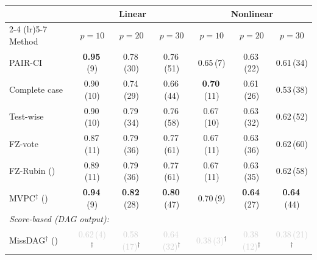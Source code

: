 \begin{tabular}{lcccccc}
    \toprule
                  & \multicolumn{3}{c}{Linear} & \multicolumn{3}{c}{Nonlinear} \\
    \cmidrule(lr){2-4} \cmidrule(lr){5-7}
    Method        & $p{=}10$ & $p{=}20$ & $p{=}30$ & $p{=}10$ & $p{=}20$ & $p{=}30$ \\
    \midrule
    PAIR-CI                                       & \textbf{0.95}\,{\scriptsize(9)} & 0.78\,{\scriptsize(30)} & 0.76\,{\scriptsize(51)} & 0.65\,{\scriptsize(7)} & 0.63\,{\scriptsize(22)} & 0.61\,{\scriptsize(34)} \\
    Complete case                                 & 0.90\,{\scriptsize(10)} & 0.74\,{\scriptsize(29)} & 0.66\,{\scriptsize(44)} & \textbf{0.70}\,{\scriptsize(11)} & 0.61\,{\scriptsize(26)} & 0.53\,{\scriptsize(38)} \\
    Test-wise                                     & 0.90\,{\scriptsize(10)} & 0.79\,{\scriptsize(34)} & 0.76\,{\scriptsize(58)} & 0.67\,{\scriptsize(10)} & 0.63\,{\scriptsize(32)} & 0.62\,{\scriptsize(52)} \\
    FZ-vote                                       & 0.87\,{\scriptsize(11)} & 0.79\,{\scriptsize(36)} & 0.77\,{\scriptsize(61)} & 0.67\,{\scriptsize(11)} & 0.63\,{\scriptsize(36)} & 0.62\,{\scriptsize(60)} \\
    FZ-Rubin (\citeauthor{witte2022multiple})     & 0.89\,{\scriptsize(11)} & 0.79\,{\scriptsize(36)} & 0.77\,{\scriptsize(61)} & 0.67\,{\scriptsize(11)} & 0.63\,{\scriptsize(35)} & 0.62\,{\scriptsize(58)} \\
    MVPC$^\ddagger$ (\citeauthor{tu2019causal})   & \textbf{0.94}\,{\scriptsize(9)} & \textbf{0.82}\,{\scriptsize(28)} & \textbf{0.80}\,{\scriptsize(47)} & 0.70\,{\scriptsize(9)} & \textbf{0.64}\,{\scriptsize(27)} & \textbf{0.64}\,{\scriptsize(44)} \\
    \midrule
    \multicolumn{7}{l}{\emph{Score-based (DAG output):}} \\
    MissDAG$^\dagger$ (\citeauthor{gao2022missdag}) & \textcolor{lightgray}{0.62\,{\scriptsize(4)}}$^\dagger$ & \textcolor{lightgray}{0.58\,{\scriptsize(17)}}$^\dagger$ & \textcolor{lightgray}{0.64\,{\scriptsize(32)}}$^\dagger$ & \textcolor{lightgray}{0.38\,{\scriptsize(3)}}$^\dagger$ & \textcolor{lightgray}{0.38\,{\scriptsize(12)}}$^\dagger$ & \textcolor{lightgray}{0.38\,{\scriptsize(21)}}$^\dagger$ \\
    \bottomrule
\end{tabular}
